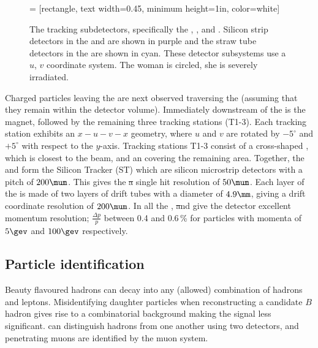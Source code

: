 \begin{figure}
  \begin{center}
     = [rectangle, text width=0.45\textwidth, minimum height=1in, color=white]
  \end{center}
  \caption[\lhcb tracking stations]
  {\small
    The \lhcb tracking subdetectors, specifically the \ttracker, \Tone, \Ttwo and \Tthree.
    Silicon strip detectors in the \intr and \intr are shown in purple and the straw tube detectors
    in the \ot are shown in cyan.
    These detector subsystems use a $u$, $v$ coordinate system.
    The woman is circled, she is severely irradiated.
  }
  \label{fig:lhcb:tracking}
\end{figure}

Charged particles leaving the \velo are next observed traversing the \ttracker (assuming that they
remain within the \lhcb detector volume).
Immediately downstream of the \ttracker is the \lhcb magnet, followed by the remaining three
tracking stations (T1-3).
Each tracking station exhibits an $x-u-v-x$ geometry, where $u$ and $v$ are rotated by $-5^\circ$ and
$+5^\circ$ with respect to the $y$-axis.
Tracking stations T1-3 consist of a cross-shaped \intr, which is closest to the beam, and
an \ot covering the remaining area.
Together, the \ttracker and \intr form the Silicon Tracker (ST) which are silicon microstrip
detectors with a pitch of $200\mum$.
This gives the \st a single hit resolution of $50\mum$.
Each layer of the \ot is made of two layers of drift tubes with a diameter of $4.9\mm$, giving a
drift coordinate resolution of $200\mum$.
In all the \velo, \st and \ot give the \lhcb detector excellent momentum resolution;
$\tfrac{\Delta p}{p}$ between 0.4 and 0.6\,\% for particles with momenta of $5\gev$ and $100\gev$
respectively.


\subsection{Particle identification}
Beauty flavoured hadrons can decay into any (allowed) combination of hadrons and
leptons.
Misidentifying daughter particles when reconstructing a candidate $B$ hadron gives rise to a
combinatorial background making the signal less significant.
\lhcb can distinguish hadrons from one another using two \rich detectors, and penetrating muons are
identified by the muon system.


